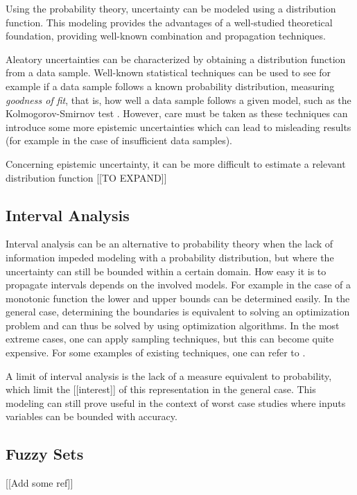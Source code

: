 Using the probability theory, uncertainty can be modeled using a distribution function. This modeling provides the advantages of a well-studied theoretical foundation, providing well-known combination and propagation techniques.

Aleatory uncertainties can be characterized by obtaining a distribution function from a data sample.
Well-known statistical techniques can be used to see for example if a data sample follows a known probability distribution, measuring \emph{goodness of fit}, that is, how well a data sample follows a given model, such as the Kolmogorov-Smirnov test \cite{Massey_1951}. 
However, care must be taken as these techniques can introduce some more epistemic uncertainties which can lead to misleading results (for example in the case of insufficient data samples).

Concerning epistemic uncertainty, it can be more difficult to estimate a relevant distribution function  [[TO EXPAND]]

\subsection{Interval Analysis}

Interval analysis can be an alternative to probability theory when the lack of information impeded modeling with a probability distribution, but where the uncertainty can still be bounded within a certain domain.
How easy it is to propagate intervals depends on the involved models. For example in the case of a monotonic function the lower and upper bounds can be determined easily. In the general case, determining the boundaries is equivalent to solving an optimization problem and can thus be solved by using optimization algorithms. In the most extreme cases, one can apply sampling techniques, but this can become quite expensive.
For some examples of existing techniques, one can refer to \cite{Kreinovich_2008}.

A limit of interval analysis is the lack of a measure equivalent to probability, which limit the [[interest]] of this representation in the general case. This modeling can still prove useful in the context of worst case studies where inputs variables can be bounded with accuracy.

\subsection{Fuzzy Sets}

[[Add some ref]]


